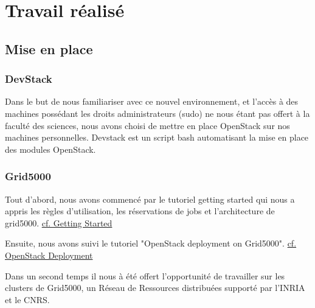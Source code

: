 \documentclass{report}
\begin{document}
\chapter{Travail réalisé}
    \section{Mise en place}
        \subsection{DevStack}
            Dans le but de nous familiariser avec ce nouvel environnement,
            et l'accès à des machines possédant les droits administrateurs (sudo)
            ne nous étant pas offert à la faculté des sciences,
            nous avons choisi de mettre en place OpenStack sur nos machines personnelles.\break
            Devstack est un script bash automatisant la mise en place des modules OpenStack.

        \subsection{Grid5000}
        
            Tout d'abord, nous avons commencé par le tutoriel getting started qui nous a appris les règles d'utilisation,  les réservations de jobs et l'architecture de grid5000.\break
            \href{https://www.grid5000.fr/mediawiki/index.php/Getting_Started}{cf. Getting Started}
            
            Ensuite, nous avons suivi le tutoriel "OpenStack deployment on Grid5000".\break
            \href{https://www.grid5000.fr/mediawiki/index.php/OpenStack_deployment_on_Grid5000}{cf. OpenStack Deployment}
        
            Dans un second temps il nous à été offert l'opportunité de travailler sur les clusters
            de Grid5000, un Réseau de Ressources distribuées supporté par l'INRIA et le CNRS.\bigbreak
            
\end{document}
